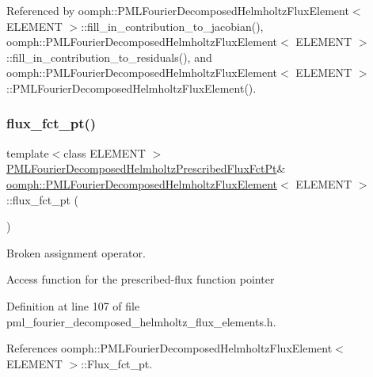 Referenced by oomph\+::\+P\+M\+L\+Fourier\+Decomposed\+Helmholtz\+Flux\+Element$<$ E\+L\+E\+M\+E\+N\+T $>$\+::fill\+\_\+in\+\_\+contribution\+\_\+to\+\_\+jacobian(), oomph\+::\+P\+M\+L\+Fourier\+Decomposed\+Helmholtz\+Flux\+Element$<$ E\+L\+E\+M\+E\+N\+T $>$\+::fill\+\_\+in\+\_\+contribution\+\_\+to\+\_\+residuals(), and oomph\+::\+P\+M\+L\+Fourier\+Decomposed\+Helmholtz\+Flux\+Element$<$ E\+L\+E\+M\+E\+N\+T $>$\+::\+P\+M\+L\+Fourier\+Decomposed\+Helmholtz\+Flux\+Element().

\mbox{\label{classoomph_1_1PMLFourierDecomposedHelmholtzFluxElement_ae27d4f85798035296911cdfef02a4d40}} 
\subsubsection{\texorpdfstring{flux\+\_\+fct\+\_\+pt()}{flux\_fct\_pt()}}
{\footnotesize\ttfamily template$<$class E\+L\+E\+M\+E\+NT $>$ \\
\hyperlink{classoomph_1_1PMLFourierDecomposedHelmholtzFluxElement_a21d234dc11d179dbe417b624c41e764f}{P\+M\+L\+Fourier\+Decomposed\+Helmholtz\+Prescribed\+Flux\+Fct\+Pt}\& \hyperlink{classoomph_1_1PMLFourierDecomposedHelmholtzFluxElement}{oomph\+::\+P\+M\+L\+Fourier\+Decomposed\+Helmholtz\+Flux\+Element}$<$ E\+L\+E\+M\+E\+NT $>$\+::flux\+\_\+fct\+\_\+pt (\begin{DoxyParamCaption}{ }\end{DoxyParamCaption})\hspace{0.3cm}{\ttfamily [inline]}}



Broken assignment operator. 

Access function for the prescribed-\/flux function pointer 

Definition at line 107 of file pml\+\_\+fourier\+\_\+decomposed\+\_\+helmholtz\+\_\+flux\+\_\+elements.\+h.



References oomph\+::\+P\+M\+L\+Fourier\+Decomposed\+Helmholtz\+Flux\+Element$<$ E\+L\+E\+M\+E\+N\+T $>$\+::\+Flux\+\_\+fct\+\_\+pt.

